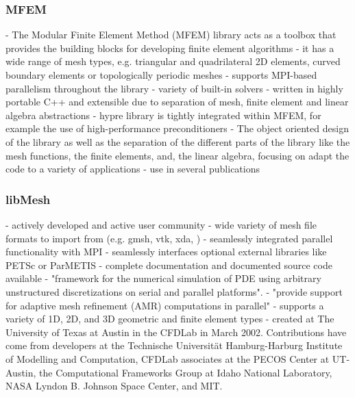 \documentclass[11pt,twoside]{scrartcl}
\begin{document}
  \subsubsection{MFEM}\cite{mfem}
  - The Modular Finite Element Method (MFEM) library acts as a toolbox that provides the building blocks for developing finite element algorithms\newline
  - it has a wide range of mesh types, e.g. triangular and quadrilateral 2D elements, curved boundary elements or topologically periodic meshes\newline
  - supports MPI-based parallelism throughout the library\newline
  - variety of built-in solvers\newline
  - written in highly portable C++ and extensible due to separation of mesh, finite element and linear algebra abstractions\newline
  - hypre library is tightly integrated within MFEM, for example the use of high-performance preconditioners
  - The object oriented design of the library as well as the separation of the different parts of the library like the mesh functions, the finite elements, and, the linear algebra, focusing on adapt the code to a variety of applications
  - use in several publications \cite{mfemPubs}
  \subsubsection{libMesh}\cite{libmesh}
  - actively developed and active user community\newline
  - wide variety of mesh file formats to import from (e.g. gmsh, vtk, xda, )\newline
  - seamlessly integrated parallel functionality with MPI\newline
  - seamlessly interfaces optional external libraries like PETSc or ParMETIS\newline
  - complete documentation and documented source code available\newline
  - "framework for the numerical simulation of PDE using arbitrary unstructured discretizations on serial and parallel platforms".\newline
  - "provide support for adaptive mesh refinement (AMR) computations in parallel"\newline
  - supports a variety of 1D, 2D, and 3D geometric and finite element types\newline
  - created at The University of Texas at Austin in the CFDLab in March 2002. Contributions have come from developers at the Technische Universität Hamburg-Harburg Institute of Modelling and Computation, CFDLab associates at the PECOS Center at UT-Austin, the Computational Frameworks Group at Idaho National Laboratory, NASA Lyndon B. Johnson Space Center, and MIT.
\newpage
\end{document}
